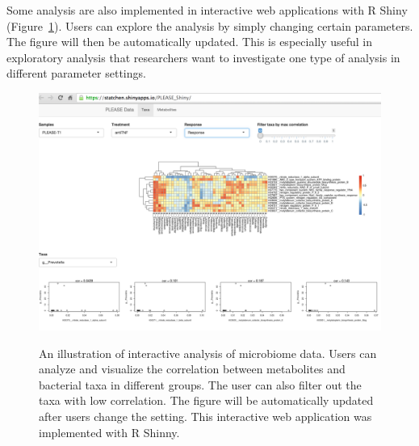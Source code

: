 Some analysis are also implemented in interactive web applications with R Shiny (Figure~\ref{F64_Shiny}). Users can explore the analysis by simply changing certain parameters. The figure will then be automatically updated. This is especially useful in exploratory analysis that researchers want to investigate one type of analysis in different parameter settings.


\begin{figure}[p]
	\centering
	{\includegraphics[scale=0.4,trim=0 0 0 0,clip]{Figure/F64_Shiny.pdf}
	}
	\caption[An illustration of interactive analysis of microbiome data]{An illustration of interactive analysis of microbiome data. Users can analyze and visualize the correlation between metabolites and bacterial taxa in different groups. The user can also filter out the taxa with low correlation. The figure will be automatically updated after users change the setting. This interactive web application was implemented with R Shinny. 
	}
	\label{F64_Shiny}
\end{figure}